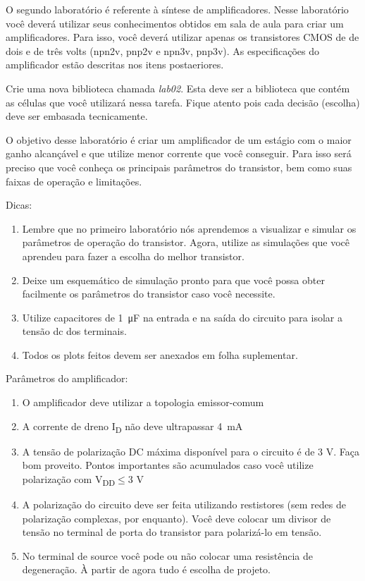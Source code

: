 O segundo laboratório é referente à síntese de amplificadores. Nesse laboratório você deverá utilizar seus conhecimentos obtidos em sala de aula para criar um amplificadores. Para isso, você deverá utilizar apenas os transistores CMOS de de dois e de três volts (npn2v, pnp2v e npn3v, pnp3v). As especificações do amplificador estão descritas nos itens postaeriores.

Crie uma nova biblioteca chamada {\em lab02}. Esta deve ser a biblioteca que contém as células que você utilizará nessa tarefa. Fique atento pois cada decisão (escolha) deve ser embasada tecnicamente.

O objetivo desse laboratório é criar um amplificador de um estágio com o maior ganho alcançável e que utilize menor corrente que você conseguir. Para isso será preciso que você conheça os principais parâmetros do transistor, bem como suas faixas de operação e limitações.

\noindent\hrulefill

\noindent Dicas:
\begin{enumerate}
  \item Lembre que no primeiro laboratório nós aprendemos a visualizar e simular os parâmetros de operação do transistor. Agora, utilize as simulações que você aprendeu para fazer a escolha do melhor transistor.
  \item Deixe um esquemático de simulação pronto para que você possa obter facilmente os parâmetros do transistor caso você necessite.
  \item Utilize capacitores de \SI{1}{\micro\farad} na entrada e na saída do circuito para isolar a tensão dc dos terminais.
  \item Todos os plots feitos devem ser anexados em folha suplementar.
\end{enumerate}

\noindent\hrulefill

\noindent Parâmetros do amplificador:
\begin{enumerate}
  \item O amplificador deve utilizar a topologia emissor-comum
  \item A corrente de dreno I\textsubscript{D} não deve ultrapassar \SI{4}{\milli\ampere}
  \item A tensão de polarização DC máxima disponível para o circuito é de 3 V. Faça bom proveito. Pontos importantes são acumulados caso você utilize polarização com V\textsubscript{DD}$\leq$3 V
  \item A polarização do circuito deve ser feita utilizando restistores (sem redes de polarização complexas, por enquanto). Você deve colocar um divisor de tensão no terminal de porta do transistor para polarizá-lo em tensão.
  \item No terminal de source você pode ou não colocar uma resistência de degeneração. À partir de agora tudo é escolha de projeto.
\end{enumerate}

